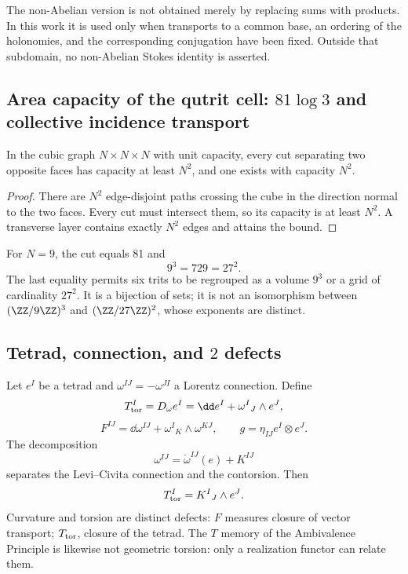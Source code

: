 The non-Abelian version is not obtained merely by replacing sums with products.
In this work it is used only when transports to a common
base, an ordering of the holonomies, and the corresponding conjugation have been fixed. Outside
that subdomain, no non-Abelian Stokes identity is asserted.

\subsection{Area capacity of the qutrit cell: \(81\log 3\) and collective incidence transport}

\begin{theorem}
In the cubic graph \(N\times N\times N\) with unit capacity, every cut
separating two opposite faces has capacity at least \(N^2\), and one exists
with capacity \(N^2\).
\end{theorem}
\begin{proof}
There are \(N^2\) edge-disjoint paths crossing the cube in the direction
normal to the two faces. Every cut must intersect them, so its capacity is
at least \(N^2\). A transverse layer contains exactly \(N^2\) edges and
attains the bound.
\end{proof}

For \(N=9\), the cut equals 81 and
\[
 9^3=729=27^2.
\]
The last equality permits six trits to be regrouped as a volume \(9^3\) or a
grid of cardinality \(27^2\). It is a bijection of sets; it is not an
isomorphism between
\((\ZZ/9\ZZ)^3\) and \((\ZZ/27\ZZ)^2\), whose exponents are distinct.

\subsection{Tetrad, connection, and \(2\) defects}

Let \(e^I\) be a tetrad and \(\omega^{IJ}=-\omega^{JI}\) a Lorentz
connection. Define
\[
 T_{\rm tor}^I=D_\omega e^I
 =\dd e^I+\omega^I{}_J\wedge e^J,
\]
\[
 F^{IJ}=\dd\omega^{IJ}+\omega^I{}_K\wedge\omega^{KJ},
 \qquad
 g=\eta_{IJ}e^I\otimes e^J.
\]
The decomposition
\[
 \omega^{IJ}=\mathring\omega^{IJ}(e)+K^{IJ}
\]
separates the Levi--Civita connection and the contorsion. Then
\[
 T_{\rm tor}^I=K^I{}_J\wedge e^J.
\]
Curvature and torsion are distinct defects: \(F\) measures closure of
vector transport; \(T_{\rm tor}\), closure of the tetrad. The
\(T\) memory of the Ambivalence Principle is likewise not geometric torsion: only a
realization functor can relate them.

